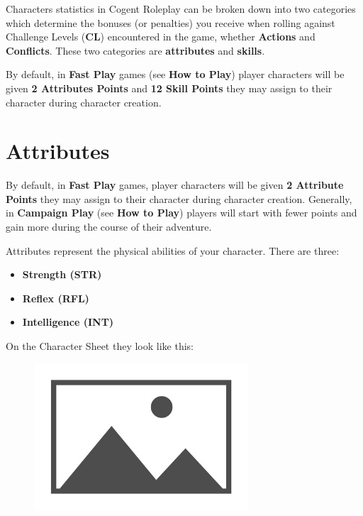 Characters statistics in Cogent Roleplay can be broken down into two categories which determine the bonuses (or penalties) you receive when rolling against Challenge Levels (\textbf{CL}) encountered in the game, whether \textbf{Actions} and \textbf{Conflicts}. These two categories are \textbf{attributes} and \textbf{skills}.

By default, in \textbf{Fast Play} games (see \textbf{How to Play}) player characters will be given \textbf{2 Attributes Points} and \textbf{12 Skill Points} they may assign to their character during character creation.

\section{Attributes} \label{sec:attributes}

By default, in \textbf{Fast Play }games, player characters will be given \textbf{2 Attribute Points} they may assign to their character during character creation.  Generally, in \textbf{Campaign Play} (see \textbf{How to Play}) players will start with fewer points and gain more during the course of their adventure.

Attributes represent the physical abilities of your character.  There are three:

\begin{itemize}
    \item \textbf{Strength (STR)}
    \item \textbf{Reflex (RFL)}
    \item \textbf{Intelligence (INT)}
\end{itemize}

On the Character Sheet they look like this:

\begin{figure}[H]
    \includegraphics[width=8cm]{images/placeholder}
    \centering
\end{figure}

